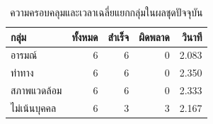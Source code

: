 \begin{table}[H]\centering\caption{ความครอบคลุมและเวลาเฉลี่ยแยกกลุ่มในผลชุดปัจจุบัน}
\begin{tabularx}{\linewidth}{Yrrrr}\toprule กลุ่ม & ทั้งหมด & สำเร็จ & ผิดพลาด & วินาที\\\midrule
อารมณ์ & 6 & 6 & 0 & 2.083\\
ท่าทาง & 6 & 6 & 0 & 2.350\\
สภาพแวดล้อม & 6 & 6 & 0 & 2.333\\
ไม่เน้นบุคคล & 6 & 3 & 3 & 2.167\\\bottomrule\end{tabularx}\end{table}